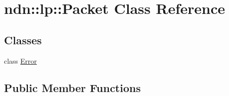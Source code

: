 \hypertarget{classndn_1_1lp_1_1Packet}{}\section{ndn\+:\+:lp\+:\+:Packet Class Reference}
\label{classndn_1_1lp_1_1Packet}
\subsection*{Classes}
\begin{DoxyCompactItemize}
\item 
class \hyperlink{classndn_1_1lp_1_1Packet_1_1Error}{Error}
\end{DoxyCompactItemize}
\subsection*{Public Member Functions}
